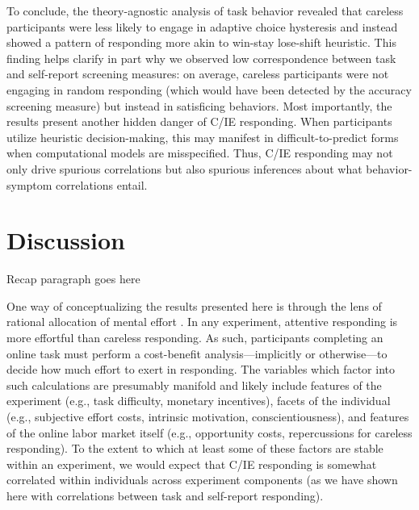 \documentclass[a4paper,notitlepage,12pt]{article}
\begin{document}
To conclude, the theory-agnostic analysis of task behavior revealed that careless participants were less likely to engage in adaptive choice hysteresis and instead showed a pattern of responding more akin to win-stay lose-shift heuristic. This finding helps clarify in part why we observed low correspondence between task and self-report screening measures: on average, careless participants were not engaging in random responding (which would have been detected by the accuracy screening measure) but instead in satisficing behaviors. Most importantly, the results present another hidden danger of C/IE responding. When participants utilize heuristic decision-making, this may manifest in difficult-to-predict forms when computational models are misspecified. Thus, C/IE responding may not only drive spurious correlations but also spurious inferences about what behavior-symptom correlations entail.

\section{Discussion}

Recap paragraph goes here

One way of conceptualizing the results presented here is through the lens of rational allocation of mental effort \cite{kool2018mental}. In any experiment, attentive responding is more effortful than careless responding. As such, participants completing an online task must perform a cost-benefit analysis---implicitly or otherwise---to decide how much effort to exert in responding. The variables which factor into such calculations are presumably manifold and likely include features of the experiment (e.g., task difficulty, monetary incentives), facets of the individual (e.g., subjective effort costs, intrinsic motivation, conscientiousness), and features of the online labor market itself (e.g., opportunity costs, repercussions for careless responding). To the extent to which at least some of these factors are stable within an experiment, we would expect that C/IE responding is somewhat correlated within individuals across experiment components (as we have shown here with correlations between task and self-report responding).
\end{document}
